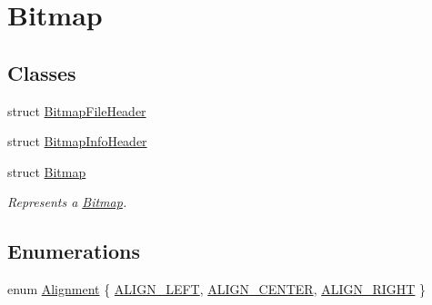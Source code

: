 \hypertarget{group__Bitmap}{}\section{Bitmap}
\label{group__Bitmap}
\subsection*{Classes}
\begin{DoxyCompactItemize}
\item 
struct \hyperlink{structBitmapFileHeader}{Bitmap\+File\+Header}
\item 
struct \hyperlink{structBitmapInfoHeader}{Bitmap\+Info\+Header}
\item 
struct \hyperlink{structBitmap}{Bitmap}
\begin{DoxyCompactList}\small\item\em Represents a \hyperlink{structBitmap}{Bitmap}. \end{DoxyCompactList}\end{DoxyCompactItemize}
\subsection*{Enumerations}
\begin{DoxyCompactItemize}
\item 
enum \hyperlink{group__Bitmap_gacdfaca60ec19c0265bac2692d7982726}{Alignment} \{ \hyperlink{group__Bitmap_ggacdfaca60ec19c0265bac2692d7982726a6ec599857e15466988726932dd592305}{A\+L\+I\+G\+N\+\_\+\+L\+E\+FT}, 
\hyperlink{group__Bitmap_ggacdfaca60ec19c0265bac2692d7982726a5624165187e56db612253e608a45b1c6}{A\+L\+I\+G\+N\+\_\+\+C\+E\+N\+T\+ER}, 
\hyperlink{group__Bitmap_ggacdfaca60ec19c0265bac2692d7982726a9c81840e8cad46418b39a8b74a246354}{A\+L\+I\+G\+N\+\_\+\+R\+I\+G\+HT}
 \}
\end{DoxyCompactItemize}
